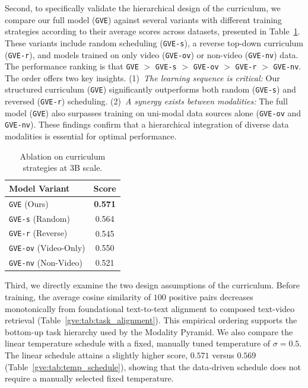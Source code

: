 \FloatBarrier
Second, to specifically validate the hierarchical design of the curriculum, we compare our full model (\texttt{GVE}) against several variants with different training strategies according to their average scores across datasets, presented in Table~\ref{gve:tab:curriculum_ablation_main}. These variants include random scheduling (\texttt{GVE-s}), a reverse top-down curriculum (\texttt{GVE-r}), and models trained on only video (\texttt{GVE-ov}) or non-video (\texttt{GVE-nv}) data. The performance ranking is that \texttt{GVE} $>$ \texttt{GVE-s} $>$ \texttt{GVE-ov} $>$ \texttt{GVE-r} $>$ \texttt{GVE-nv}. The order offers two key insights. (1)~\textit{The learning sequence is critical:} Our structured curriculum (\texttt{GVE}) significantly outperforms both random (\texttt{GVE-s}) and reversed (\texttt{GVE-r}) scheduling. (2)~\textit{A synergy exists between modalities:} The full model (\texttt{GVE}) also surpasses training on uni-modal data sources alone (\texttt{GVE-ov} and \texttt{GVE-nv}). These findings confirm that a hierarchical integration of diverse data modalities is essential for optimal performance.

\begin{table}[t]
    \centering
    \caption{Ablation on curriculum strategies at 3B scale.}
    \label{gve:tab:curriculum_ablation_main}
    \begin{tabular}{lc}
    \toprule
    Model Variant & Score \\
    \midrule
    \texttt{GVE} (Ours) & \textbf{0.571} \\
    \texttt{GVE-s} (Random) & 0.564 \\
    \texttt{GVE-r} (Reverse) & 0.545 \\
    \texttt{GVE-ov} (Video-Only) & 0.550 \\
    \texttt{GVE-nv} (Non-Video) & 0.521 \\
    \bottomrule
\end{tabular}
\end{table}

\FloatBarrier
Third, we directly examine the two design assumptions of the curriculum. Before training, the average cosine similarity of $100$ positive pairs decreases monotonically from foundational text-to-text alignment to composed text-video retrieval (Table~\ref{gve:tab:task_alignment}). This empirical ordering supports the bottom-up task hierarchy used by the Modality Pyramid. We also compare the linear temperature schedule with a fixed, manually tuned temperature of $\sigma=0.5$. The linear schedule attains a slightly higher score, $0.571$ versus $0.569$ (Table~\ref{gve:tab:temp_schedule}), showing that the data-driven schedule does not require a manually selected fixed temperature.

